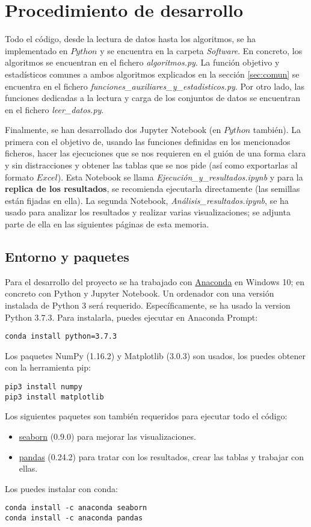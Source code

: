 \documentclass[11pt,a4paper]{article}
\begin{document}
	\section{Procedimiento de desarrollo}
	
	Todo el código, desde la lectura de datos hasta los algoritmos, se ha implementado en $Python$ y se encuentra en la carpeta \textit{Software}. En concreto, los algoritmos se encuentran en el fichero \textit{algoritmos.py}. La función objetivo y estadísticos comunes a ambos algoritmos explicados en la sección \ref{sec:comun} se encuentra en el fichero \textit{funciones\_auxiliares\_y\_estadisticos.py}. Por otro lado, las funciones dedicadas a la lectura y carga de los conjuntos de datos se encuentran en el fichero \textit{leer\_datos.py}.
	
	Finalmente, se han desarrollado dos Jupyter Notebook (en $Python$ también). La primera con el objetivo de, usando las funciones definidas en los mencionados ficheros, hacer las ejecuciones que se nos requieren en el guión de una forma clara y sin distracciones y obtener las tablas que se nos pide (así como exportarlas al formato $Excel$). Esta Notebook se llama \textit{Ejecución\_y\_resultados.ipynb} y para la \textbf{replica de los resultados}, se recomienda ejecutarla directamente (las semillas están fijadas en ella). La segunda Notebook, \textit{Análisis\_resultados.ipynb}, se ha usado para analizar los resultados y realizar varias visualizaciones; se adjunta parte de ella en las siguientes páginas de esta memoria.
	
	\subsection{Entorno y paquetes}
Para el desarrollo del proyecto se ha trabajado con \href{https://www.anaconda.com/download/}{Anaconda} en Windows 10;  en concreto con Python y Jupyter Notebook. Un ordenador con una versión instalada de Python 3 será requerido. Específicamente, se ha usado la version Python 3.7.3. Para instalarla, puedes ejecutar en Anaconda Prompt:
\begin{lstlisting}
conda install python=3.7.3
\end{lstlisting}
Los paquetes NumPy (1.16.2) y Matplotlib (3.0.3) son usados, los puedes obtener con la herramienta pip:
\begin{lstlisting}
pip3 install numpy
pip3 install matplotlib
\end{lstlisting}

Los siguientes paquetes son también requeridos para ejecutar todo el código:
\begin{itemize}
    \item \href{https://seaborn.pydata.org/}{seaborn} (0.9.0) para mejorar las visualizaciones.
    \item \href{https://pandas.pydata.org/}{pandas} (0.24.2) para tratar con los resultados, crear las tablas y trabajar con ellas.
\end{itemize}
Los puedes instalar con conda:
\begin{lstlisting}
conda install -c anaconda seaborn
conda install -c anaconda pandas
\end{lstlisting}
	
\end{document}
